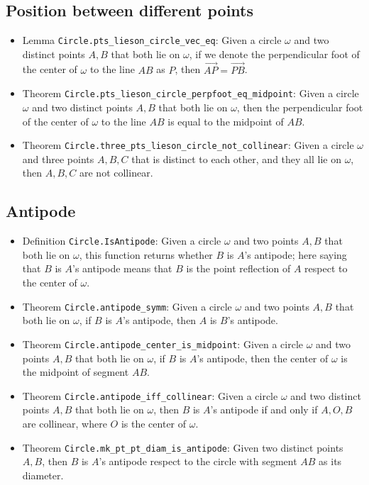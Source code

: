 \documentclass[12pt]{amsart}
\begin{document}
\subsection{Position between different points}
\begin{itemize}
    \item Lemma \verb|Circle.pts_lieson_circle_vec_eq|: Given a circle $\omega$ and two distinct points $A,B$ that both lie on $\omega$, if we denote the perpendicular foot of the center of $\omega$ to the line $AB$ as $P$, then $\overrightarrow{AP} = \overrightarrow{PB}$.
    \item Theorem \verb|Circle.pts_lieson_circle_perpfoot_eq_midpoint|: Given a circle $\omega$ and two distinct points $A,B$ that both lie on $\omega$, then the perpendicular foot of the center of $\omega$ to the line $AB$ is equal to the midpoint of $AB$.
    \item Theorem \verb|Circle.three_pts_lieson_circle_not_collinear|: Given a circle $\omega$ and three points $A,B,C$ that is distinct to each other, and they all lie on $\omega$, then $A,B,C$ are not collinear.
\end{itemize}

\subsection{Antipode}
\begin{itemize}
    \item Definition \verb|Circle.IsAntipode|: Given a circle $\omega$ and two points $A,B$ that both lie on $\omega$, this function returns whether $B$ is $A$'s antipode; here saying that $B$ is $A$'s antipode means that $B$ is the point reflection of $A$ respect to the center of $\omega$.
    \item Theorem \verb|Circle.antipode_symm|: Given a circle $\omega$ and two points $A,B$ that both lie on $\omega$, if $B$ is $A$'s antipode, then $A$ is $B$'s antipode.
    \item Theorem \verb|Circle.antipode_center_is_midpoint|: Given a circle $\omega$ and two points $A,B$ that both lie on $\omega$, if $B$ is $A$'s antipode, then the center of $\omega$ is the midpoint of segment $AB$.
    \item Theorem \verb|Circle.antipode_iff_collinear|: Given a circle $\omega$ and two distinct points $A,B$ that both lie on $\omega$, then $B$ is $A$'s antipode if and only if $A,O,B$ are collinear, where $O$ is the center of $\omega$.
    \item Theorem \verb|Circle.mk_pt_pt_diam_is_antipode|: Given two distinct points $A,B$, then $B$ is $A$'s antipode respect to the circle with segment $AB$ as its diameter.
\end{itemize}
\end{document}
